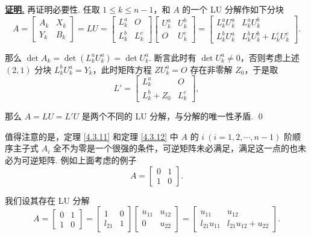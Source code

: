 \documentclass[10pt,openany]{article}
\theoremstyle{thmstyle} %
\theoremstyle{defstyle} %
\theoremstyle{prostyle} %
\theoremstyle{exastyle}
\theoremstyle{remstyle}
\renewenvironment{proof}[1][证明]{\par\underline{\textbf{#1.}} \;\fangsong}{\qed\par}
\begin{document}
\begin{proof}
	再证明必要性. 任取 \( 1 \leq k \leq n-1 \)，和 \( A \) 的一个 LU 分解作如下分块
	\[ A=\begin{bmatrix}
		A_k & X_k \\[1ex]
		Y_k & B_k
	\end{bmatrix}=LU=\begin{bmatrix}
	 L_k^{a} & O \\[1ex]
	 L_k^{b} & L_k^c
	\end{bmatrix}\begin{bmatrix}
	 U_k^{a} & U_k^b \\[1ex]
	 O & U_k^c
	\end{bmatrix}=\begin{bmatrix}
	L_k^{a}U_k^{a} & L_k^aU_k^b \\[1ex]
	L_k^{b}U_k^a & L_k^bU_k^b+L_k^cU_k^c
	\end{bmatrix}. \]
	
	那么 \( \det A_k= \det(L_k^{a}U_k^{a})=\det U_k^a \). 断言此时有 \( \det U_k^a \neq 0 \)，否则考虑上述 \( (2,1) \) 分块 \( L_k^{b}U_k^a=Y_k \)，此时矩阵方程 \( ZU_k^a=O \) 存在非零解 \( Z_0 \)，于是取
	\[ L'=\begin{bmatrix}
		L_k^{a} & O \\[1ex]
		L_k^{b}+Z_0 & L_k^c
	\end{bmatrix}, \]
	
	那么 \( A=LU=L'U \) 是两个不同的 LU 分解，与分解的唯一性矛盾. 
\end{proof}

值得注意的是，定理 \ref{4.3.11} 和定理 \ref{4.3.12} 中 \( A \) 的 \( i \ (i=1,2,\cdots,n-1) \) 阶顺序主子式 \( A_i \) 全不为零是一个很强的条件，可逆矩阵未必满足，满足这一点的也未必为可逆矩阵. 例如上面考虑的例子
\[ A=\begin{bmatrix}
	0 & 1 \\
	1 & 0
\end{bmatrix}. \]

我们设其存在 LU 分解
\[ A=\begin{bmatrix}
	0 & 1 \\
	1 & 0
\end{bmatrix}=\begin{bmatrix}
1 & 0 \\
l_{21} & 1
\end{bmatrix}\begin{bmatrix}
u_{11}& u_{12} \\
0 & u_{22}
\end{bmatrix}=\begin{bmatrix}
u_{11} & u_{12} \\
l_{21}u_{11} & l_{21}u_{12}+u_{22}
\end{bmatrix}. \]
\end{document}
